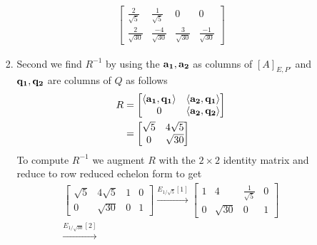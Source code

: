 \documentclass{uofa-eng-assignment}
\begin{document}
\begin{enumerate}
\begin{enumerate}
\begin{enumerate}
\begin{align*}
\begin{bmatrix}
	      		      	\frac{2}{\sqrt{5}}  & \frac{1}{\sqrt{5}}   & 0                   & 0                    \\
	      		      	\frac{2}{\sqrt{30}} & \frac{-4}{\sqrt{30}} & \frac{3}{\sqrt{30}} & \frac{-1}{\sqrt{30}} 
	      		      	\end{bmatrix}
	      		      \end{align*}
	      		\item Second we find $R^{-1}$ by using the $\vb{a_1}, \vb{a_2}$ as columns of $[A]_{E, P'}$ and $\vb{q_1}, \vb{q_2}$ are columns of $Q$ as follows
	      		      \begin{align*}
	      		      	R                                  & = \begin{bmatrix}                  
	      		      	\langle \vb{a_1}, \vb{q_1} \rangle & \langle \vb{a_2}, \vb{q_1} \rangle \\
	      		      	0                                  & \langle \vb{a_2}, \vb{q_2} \rangle 
	      		      	\end{bmatrix} \\
	      		      	                                   & = \begin{bmatrix}                  
	      		      	\sqrt{5}                           & 4\sqrt{5}                          \\
	      		      	0                                  & \sqrt{30}                          
	      		      	\end{bmatrix}
	      		      \end{align*}
	      		      To compute $R^{-1}$ we augment $R$ with the $2\times 2$ identity matrix and reduce to row reduced echelon form to get
	      		      \begin{align*}
	      		      	\begin{bmatrix}
	      		      	\sqrt{5} & 4\sqrt{5} & 1                  & 0            \\
	      		      	0        & \sqrt{30} & 0                  & 1            
	      		      	\end{bmatrix} \xrightarrow{E_{1/\sqrt{5}}[1]}             
	      		      	\begin{bmatrix}
	      		      	1        & 4         & \frac{1}{\sqrt{5}} & 0            \\
	      		      	0        & \sqrt{30} & 0                  & 1            
	      		      	\end{bmatrix} \\ \xrightarrow{E_{1/\sqrt{30}}[2]}             

\end{align*}
\end{enumerate}
\end{enumerate}
\end{enumerate}
\end{document}
